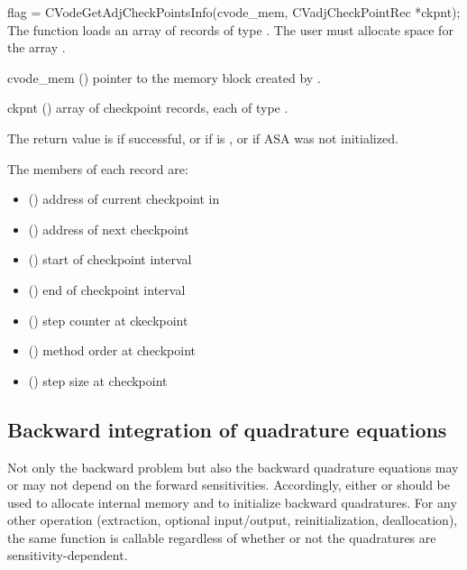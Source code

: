 {
  flag = CVodeGetAdjCheckPointsInfo(cvode\_mem, CVadjCheckPointRec *ckpnt);
}
{
  The function  loads an array of 
  records of type .
  The user must allocate space for the array .
}
{
  \begin{args}
  \item[cvode\_mem] ()
    pointer to the {\cvodes} memory block created by .
  \item[ckpnt] ()
    array of  checkpoint records, each of type .
  \end{args}
}
{  The return value is  if successful, or
    if  is , or
    if ASA was not initialized.}
{  The members of each record  are:
\begin{itemize}
 \item {} () address of current checkpoint
   in \\
 \item {} () address of next checkpoint
 \item {} () start of checkpoint interval
 \item {} () end of checkpoint interval
 \item {} () step counter at ckeckpoint 
 \item {} () method order at checkpoint 
 \item {} () step size at checkpoint 
\end{itemize}
}


\subsection{Backward integration of quadrature equations}

Not only the backward problem but also the backward quadrature equations
may or may not depend on the forward sensitivities.  Accordingly, either
 or  should be used to allocate internal
memory and to initialize backward quadratures.  For any other operation
(extraction, optional input/output, reinitialization, deallocation),
the same function is callable regardless of whether or not the quadratures
are sensitivity-dependent.

